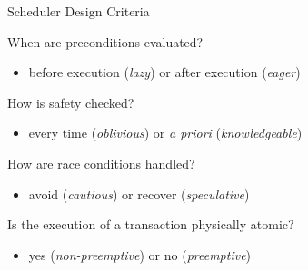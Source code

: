 \documentclass{beamer}
\begin{document}
\begin{frame}{Scheduler Design Criteria}

  When are preconditions evaluated?
  \begin{itemize}
  \item before execution (\emph{lazy}) or after execution (\emph{eager})
  \end{itemize}

  \vspace*{12pt}

  How is safety checked?
  \begin{itemize}
  \item every time (\emph{oblivious}) or \emph{a priori} (\emph{knowledgeable})
  \end{itemize}

  \vspace*{12pt}

  How are race conditions handled?
  \begin{itemize}
  \item avoid (\emph{cautious}) or recover (\emph{speculative})
  \end{itemize}

  \vspace*{12pt}

  Is the execution of a transaction physically atomic?
  \begin{itemize}
  \item yes (\emph{non-preemptive}) or no (\emph{preemptive})
  \end{itemize}

\end{frame}
\end{document}
